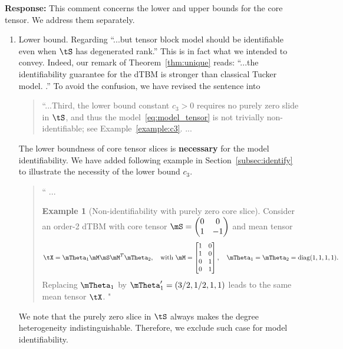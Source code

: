 \documentclass[11pt]{article}
\theoremstyle{definition}
\theoremstyle{definition}
\newtheorem{example}{Example}
\begin{document}
\begin{enumerate}[wide, labelwidth=!, labelindent=0pt]
\textbf{Response:} This comment concerns the lower and upper bounds for the core tensor. We address them separately. 

\begin{enumerate}
\item Lower bound. Regarding ``...but tensor block model should be identifiable even when $\tS$ has degenerated rank.'' This is in fact what we intended to convey. Indeed, our remark of Theorem~\ref{thm:unique} reads: ``...the identifiability guarantee for the dTBM is stronger than classical Tucker model. .'' To avoid the confusion, we have revised the sentence into

\begin{quote}
``...Third, the lower bound constant $c_3>0$ requires no purely zero slide in $\tS$, and thus the model~\eqref{eq:model_tensor} is not trivially non-identifiable; see Example~\ref{example:c3}. 
...
\end{quote}

The lower boundness of core tensor slices is {\bf necessary} for the model identifiability. We have added following example in Section~\ref{subsec:identify} to illustrate the necessity of the lower bound $c_3$. 

\begin{quote}
    `` ...
    
    \begin{example}[Non-identifiability with purely zero core slice] Consider an order-2 dTBM with core tensor $\mS = \begin{pmatrix} 0 & 0\\
    1 & -1
    \end{pmatrix}$ and mean tensor 
    \begin{equation}
        \tX =  \mTheta_1 \mM \mS   \mM^T \mTheta_2, \quad \text{with } \mM = \begin{bmatrix} 1 & 0 \\
        1 & 0 \\
        0 & 1 \\
        0 & 1 \\
        \end{bmatrix}, \quad \mTheta_1 =\mTheta_2= \text{diag}(1,1,1,1).
    \end{equation}
Replacing $\mTheta_1$ by $\mTheta'_1 = (3/2, 1/2, 1,1)$ leads to the same mean tensor $\tX$. "
\end{example}
\end{quote}
We note that the purely zero slice in $\tS$ always makes the degree heterogeneity indistinguishable. Therefore, we exclude such case for model identifiability.


\end{enumerate}
\end{enumerate}
\end{document}
